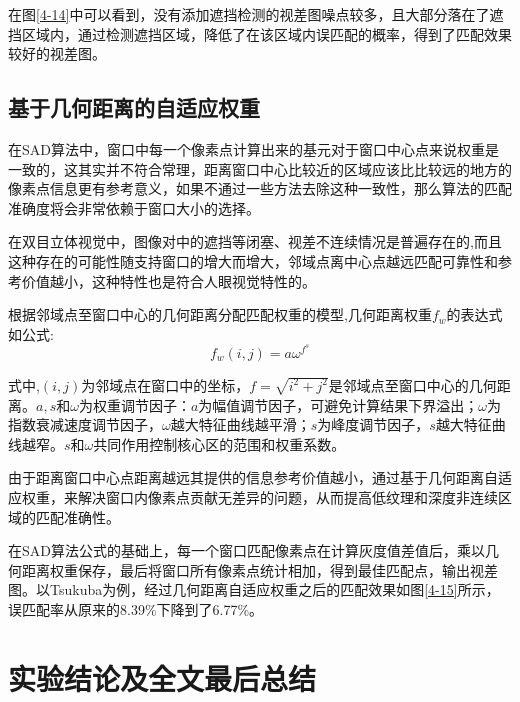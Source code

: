 
在图\ref{4-14}中可以看到，没有添加遮挡检测的视差图噪点较多，且大部分落在了遮挡区域内，通过检测遮挡区域，降低了在该区域内误匹配的概率，得到了匹配效果较好的视差图。

\subsection{基于几何距离的自适应权重}

在SAD算法中，窗口中每一个像素点计算出来的基元对于窗口中心点来说权重是一致的，这其实并不符合常理，距离窗口中心比较近的区域应该比比较远的地方的像素点信息更有参考意义，如果不通过一些方法去除这种一致性，那么算法的匹配准确度将会非常依赖于窗口大小的选择。

在双目立体视觉中，图像对中的遮挡等闭塞、视差不连续情况是普遍存在的,而且这种存在的可能性随支持窗口的增大而增大，邻域点离中心点越远匹配可靠性和参考价值越小，这种特性也是符合人眼视觉特性的。


根据邻域点至窗口中心的几何距离分配匹配权重的模型,几何距离权重$f_{w}$的表达式如公式: 
\begin{equation}
f_{w}(i,j) = a\omega ^{f^{s}}
\end{equation}

式中,$(i,j)$为邻域点在窗口中的坐标，$f=\sqrt{i^{2}+j^{2}}$是邻域点至窗口中心的几何距离。$a,s$和$\omega$为权重调节因子：$a$为幅值调节因子，可避免计算结果下界溢出；$\omega$为指数衰减速度调节因子，$\omega$越大特征曲线越平滑；$s$为峰度调节因子，$s$越大特征曲线越窄。$s$和$\omega$共同作用控制核心区的范围和权重系数。

由于距离窗口中心点距离越远其提供的信息参考价值越小，通过基于几何距离自适应权重，来解决窗口内像素点贡献无差异的问题，从而提高低纹理和深度非连续区域的匹配准确性。

在SAD算法公式的基础上，每一个窗口匹配像素点在计算灰度值差值后，乘以几何距离权重保存，最后将窗口所有像素点统计相加，得到最佳匹配点，输出视差图。以Tsukuba为例，经过几何距离自适应权重之后的匹配效果如图\ref{4-15}所示，误匹配率从原来的8.39\%下降到了6.77\%。


\section{实验结论及全文最后总结}

